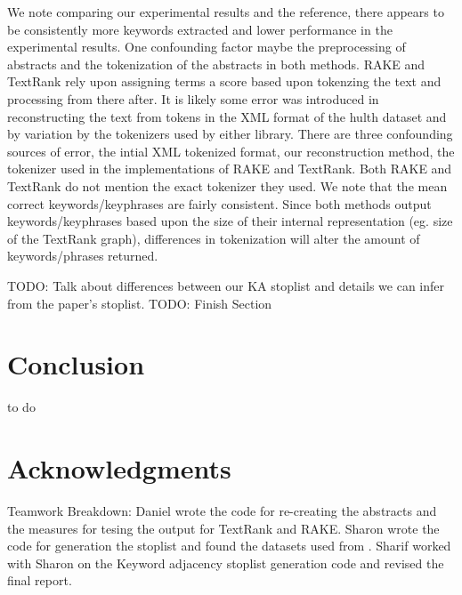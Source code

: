 \documentclass[11pt,a4paper]{article}
\begin{document}
We note comparing our experimental results and the reference, there appears to be consistently more keywords extracted and lower performance in the experimental results. One confounding factor maybe the preprocessing of abstracts and the tokenization of the abstracts in both methods. RAKE and TextRank rely upon assigning terms a score based upon tokenzing the text and processing from there after. It is likely some error was introduced in reconstructing the text from tokens in the XML format of the hulth dataset and by variation by the tokenizers used by either library. There are three confounding sources of error, the intial XML tokenized format, our reconstruction method, the tokenizer used in the implementations of RAKE and TextRank. Both RAKE and TextRank do not mention the exact tokenizer they used. We note that the mean correct keywords/keyphrases are fairly consistent. Since both methods output keywords/keyphrases based upon the size of their internal representation (eg. size of the TextRank graph), differences in tokenization will alter the amount of keywords/phrases returned.

TODO: Talk about differences between our KA stoplist and details we can infer from the paper's stoplist.
TODO: Finish Section


\section{Conclusion}

to do 

\section{Acknowledgments}

Teamwork Breakdown: Daniel wrote the code for re-creating the abstracts and the measures for tesing the output for TextRank and RAKE. Sharon wrote the code for generation the stoplist and found the datasets used from \citet{hulth-2003-improved}. Sharif worked with Sharon on the Keyword adjacency stoplist generation code and revised the final report. 
 

%
%




\end{document}
